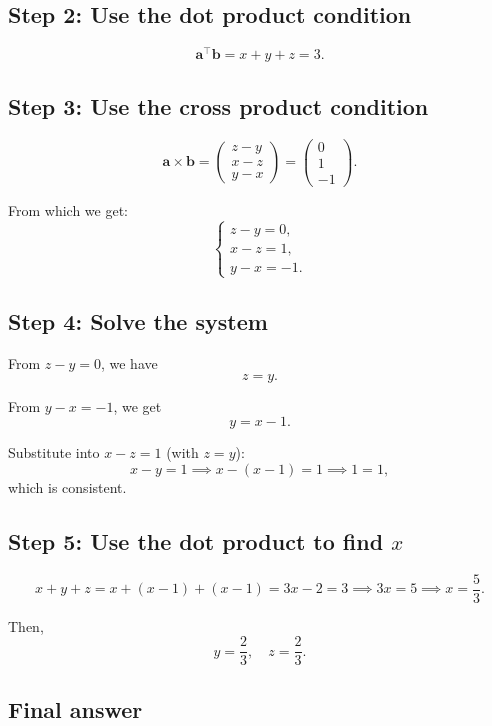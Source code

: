 \documentclass[journal]{IEEEtran}
\begin{document}
\subsection*{Step 2: Use the dot product condition}

\[
\mathbf{a}^\top \mathbf{b} = x + y + z = 3.
\]

\subsection*{Step 3: Use the cross product condition}

\[
\mathbf{a} \times \mathbf{b} = 
\begin{pmatrix}
z - y \\
x - z \\
y - x
\end{pmatrix}
= 
\begin{pmatrix}
0 \\
1 \\
-1
\end{pmatrix}.
\]

From which we get:
\[
\begin{cases}
z - y = 0, \\
x - z = 1, \\
y - x = -1.
\end{cases}
\]

\subsection*{Step 4: Solve the system}

From \(z - y = 0\), we have
\[
z = y.
\]

From \(y - x = -1\), we get
\[
y = x - 1.
\]

Substitute into \(x - z = 1\) (with \(z = y\)):
\[
x - y = 1 \implies x - (x - 1) = 1 \implies 1 = 1,
\]
which is consistent.

\subsection*{Step 5: Use the dot product to find \(x\)}

\[
x + y + z = x + (x - 1) + (x - 1) = 3x - 2 = 3 \implies 3x = 5 \implies x = \frac{5}{3}.
\]

Then,
\[
y = \frac{2}{3}, \quad z = \frac{2}{3}.
\]

\subsection*{Final answer}
\end{document}
